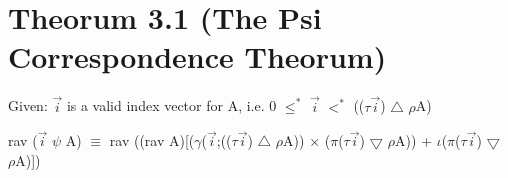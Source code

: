 \newcommand{\cat}{+\!\!\!\!+}
\newcommand{\take}{\,\bigtriangleup\,}
\newcommand{\drop}{\,\bigtriangledown\,}
\newcommand{\karate}{\!\widehat{\hbox to 10pt{}}\!}
\newcommand{\rshp}{\widehat{\rho}}
\newcommand{\one}{$<$\! 1\!$>$}
\newtheorem{definition}{Definition}
\newcommand{\Size}{\tau\,}
\newcommand{\Dim}{\delta\,}
\newcommand{\Ravel}{\,\mbox{\tt rav}\,}
\newcommand{\Reshape}{\,\widehat{\rho}\,}
\newcommand{\Reduce}{\,\mbox{\tt red}\,}



\section*{Theorum 3.1 (The Psi Correspondence Theorum)}
Given:  $\vec{i}$ is a valid index vector for A, i.e. 0 $\leq^*$ $\vec{i}$ $<^*$ (($\tau$$\vec{i}$) $\bigtriangleup$ $\rho$A)

rav ($\vec{i}$ $\psi$ A) $\equiv$ rav ((rav A)[($\gamma$($\vec{i}$;(($\tau$$\vec{i}$) $\bigtriangleup$ $\rho$A))
$\times$ ($\pi$($\tau$$\vec{i}$) $\bigtriangledown$ $\rho$A)) +
$\iota$($\pi$($\tau$$\vec{i}$) $\bigtriangledown$ $\rho$A)])

